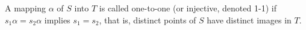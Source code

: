 A mapping $\alpha$ of $S$ into $T$ is called one-to-one (or injective, denoted 1-1) if $s_1\alpha = s_2\alpha$ implies $s_1 = s_2$, that is, distinct points of $S$ have distinct images in $T$.
